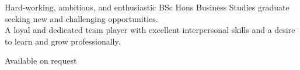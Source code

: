 \documentclass[a4paper]{limecv}
\begin{document}

\begin{cvSidebar}

  \begin{cvProfile}
    Hard-working, ambitious, and enthusiastic BSc Hons Business Studies
    graduate seeking new and challenging opportunities.\\
    A loyal and dedicated team player with excellent interpersonal 
    skills and a desire to learn and grow professionally.
  \end{cvProfile}
  
  \begin{cvContact}
  \end{cvContact}

  \begin{cvReferencesSB}
    Available on request
  \end{cvReferencesSB}

\end{cvSidebar}
\end{document}
